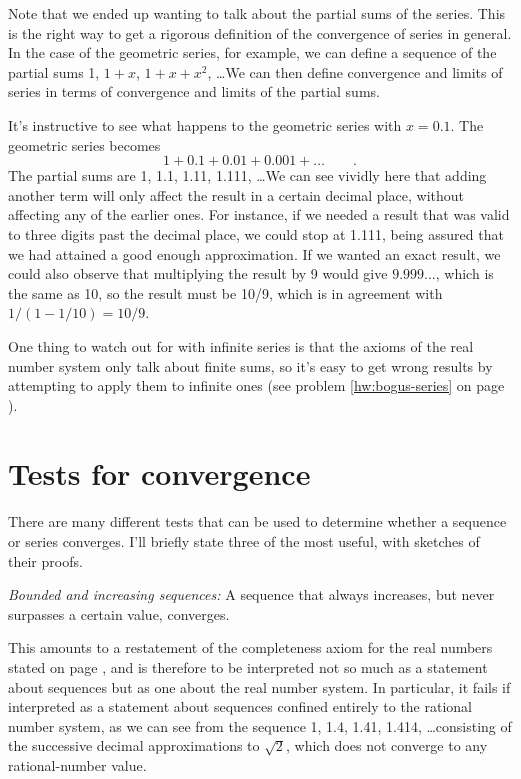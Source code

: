 Note that we ended up wanting to talk about the partial sums of the series. This is the right way to get a rigorous definition of
the convergence of series in general.
In the case of the geometric series, for example,
we can define a sequence of the
partial sums 1, $1+x$, $1+x+x^2$, \ldots We can then define convergence and limits of series in terms of convergence and limits
of the partial sums.

It's instructive to see what happens to the geometric series with $x=0.1$. The geometric series becomes\label{geometric-tenths}
\begin{equation*}
  1 + 0.1 + 0.01 + 0.001 + \ldots \qquad .
\end{equation*}
The partial sums are 1, 1.1, 1.11, 1.111, \ldots We can see vividly here that adding another term will only affect
the result in a certain decimal place, without affecting any of the earlier ones. For instance, if we needed a
result that was valid to three digits past the decimal place, we could stop at 1.111, being assured that we had
attained a good enough approximation. If we wanted an exact result, we could also observe that multiplying the
result by 9 would give $9.999\ldots$, which is the same as 10, so the result must be 10/9, which is in agreement
with $1/(1-1/10)=10/9$.

One thing to watch out for with infinite series is that
the axioms of the real number system only talk about finite sums, so it's easy to get wrong results
by attempting to apply them to infinite ones (see problem
\ref{hw:bogus-series} on page \pageref{hw:bogus-series}).\label{infinite-sum-warning}

\section{Tests for convergence}

There are many different tests that can be used to determine whether a sequence or series converges.
I'll briefly state three of the most useful, with sketches of their proofs.

\emph{Bounded and increasing sequences\/:} A sequence that always increases, but never
surpasses a certain value, converges.

This amounts to a restatement of the completeness axiom for the real numbers stated on page \pageref{compactness},
and is therefore to be interpreted not so much as a statement about sequences but as one about the
real number system. In particular, it fails if interpreted as a statement about sequences confined entirely to the rational number system, as we can see from the
sequence 1, 1.4, 1.41, 1.414, \ldots consisting of the successive decimal approximations to $\sqrt{2}$,
which does not converge to any rational-number value.

